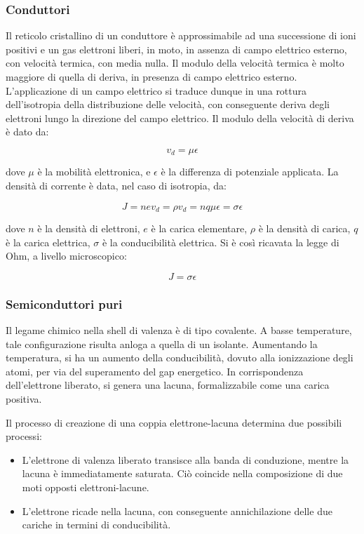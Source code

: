 \documentclass{article}
\begin{document}
\subsubsection{Conduttori}
Il reticolo cristallino di un conduttore è approssimabile ad una successione di ioni positivi e un gas elettroni liberi,
in moto, in assenza di campo elettrico esterno, con velocità termica, con media nulla.
Il modulo della velocità termica è molto maggiore di quella di deriva, in presenza di campo elettrico esterno.
L'applicazione di un campo elettrico si traduce dunque in una rottura dell'isotropia della distribuzione delle velocità, con conseguente deriva degli elettroni
lungo la direzione del campo elettrico.
Il modulo della velocità di deriva è dato da:

\begin{equation}
    v_d = \mu \epsilon
\end{equation}

dove $\mu$ è la mobilità elettronica, e $\epsilon$ è la differenza di potenziale applicata.
La densità di corrente è data, nel caso di isotropia, da:

\begin{equation}
    J = n e v_d= \rho v_d=n q \mu \epsilon= \sigma \epsilon
\end{equation}

dove $n$ è la densità di elettroni, $e$ è la carica elementare, $\rho$ è la densità di carica, $q$ è la carica elettrica, $\sigma$ è la conducibilità elettrica.
Si è così ricavata la legge di Ohm, a livello microscopico:

\begin{equation}
    J = \sigma \epsilon
\end{equation}
\subsubsection{Semiconduttori puri}
Il legame chimico nella shell di valenza è di tipo covalente.
A basse temperature, tale configurazione risulta anloga a quella di un isolante.
Aumentando la temperatura, si ha un aumento della conducibilità, dovuto alla ionizzazione degli atomi,
per via del superamento del gap energetico.
In corrispondenza dell'elettrone liberato, si genera una lacuna, formalizzabile come una carica positiva.

Il processo di creazione di una coppia elettrone-lacuna determina due possibili processi:

\begin{itemize}
    \item L'elettrone di valenza liberato transisce alla banda di conduzione, mentre la lacuna è immediatamente saturata.
          Ciò coincide nella composizione di due moti opposti elettroni-lacune.
    \item L'elettrone ricade nella lacuna, con conseguente annichilazione delle due cariche in termini di conducibilità.
\end{itemize}
\end{document}
